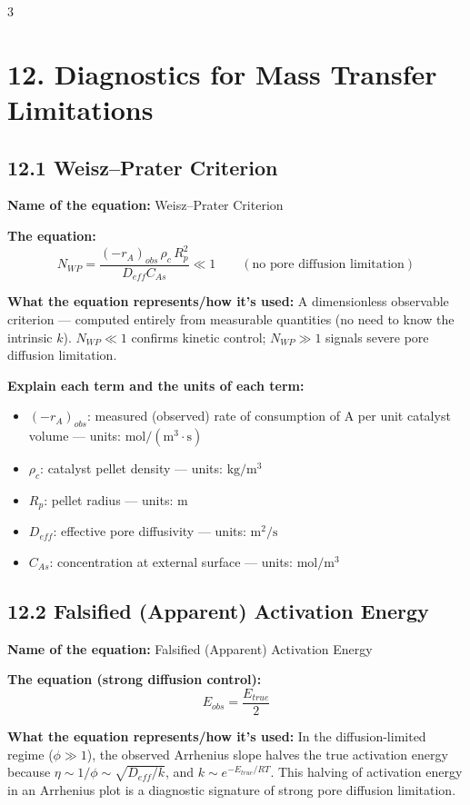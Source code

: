 \documentclass[8pt]{extarticle}
\begin{document}
\begin{multicols*}{3}
\section*{12. Diagnostics for Mass Transfer Limitations}

\subsection*{12.1 Weisz--Prater Criterion}

\textbf{Name of the equation:} Weisz--Prater Criterion

\textbf{The equation:}
\[
N_{WP}
=
\frac{(-r_A)_{obs}\,\rho_c\,R_p^2}{D_{eff}C_{As}}
\ll 1
\qquad
(\text{no pore diffusion limitation})
\]

\textbf{What the equation represents/how it's used:} A dimensionless observable criterion --- computed entirely from measurable quantities (no need to know the intrinsic \(k\)). \(N_{WP}\ll 1\) confirms kinetic control; \(N_{WP}\gg 1\) signals severe pore diffusion limitation.

\textbf{Explain each term and the units of each term:}
\begin{itemize}
\item \((-r_A)_{obs}\): measured (observed) rate of consumption of A per unit catalyst volume --- units: \(\mathrm{mol/(m^3\cdot s)}\)
\item \(\rho_c\): catalyst pellet density --- units: \(\mathrm{kg/m^3}\)
\item \(R_p\): pellet radius --- units: \(\mathrm{m}\)
\item \(D_{eff}\): effective pore diffusivity --- units: \(\mathrm{m^2/s}\)
\item \(C_{As}\): concentration at external surface --- units: \(\mathrm{mol/m^3}\)
\end{itemize}

\subsection*{12.2 Falsified (Apparent) Activation Energy}

\textbf{Name of the equation:} Falsified (Apparent) Activation Energy

\textbf{The equation (strong diffusion control):}
\[
E_{obs}=\frac{E_{true}}{2}
\]

\textbf{What the equation represents/how it's used:} In the diffusion-limited regime (\(\phi\gg 1\)), the observed Arrhenius slope halves the true activation energy because \(\eta\sim 1/\phi\sim \sqrt{D_{eff}/k}\), and \(k\sim e^{-E_{true}/RT}\). This halving of activation energy in an Arrhenius plot is a diagnostic signature of strong pore diffusion limitation.


\end{multicols*}
\end{document}
